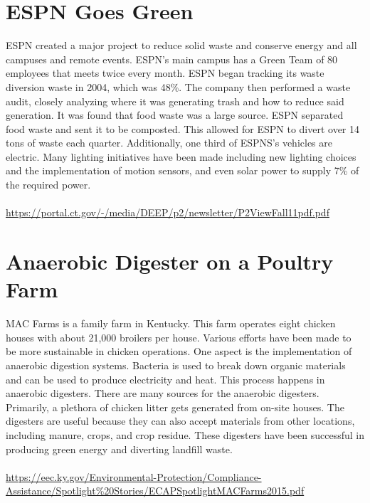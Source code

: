 \documentclass{article}
\begin{document}
\begin{spacing}{2.15}
    \section{ESPN Goes Green}
    \indent ESPN created a major project to reduce solid waste and conserve energy and all campuses and remote events. ESPN's main campus has a Green Team of 80 employees that meets twice every month. ESPN began tracking its waste diversion waste in 2004, which was 48\%. The company then performed a waste audit, closely analyzing where it was generating trash and how to reduce said generation. It was found that food waste was a large source. ESPN separated food waste and sent it to be composted. This allowed for ESPN to divert over 14 tons of waste each quarter. Additionally, one third of ESPNS's vehicles are electric. Many lighting initiatives have been made including new lighting choices and the implementation of motion sensors, and even solar power to supply 7\% of the required power. \\\\
    \url{https://portal.ct.gov/-/media/DEEP/p2/newsletter/P2ViewFall11pdf.pdf}
    \newpage
    \section{Anaerobic Digester on a Poultry Farm}
    \indent MAC Farms is a family farm in Kentucky. This farm operates eight chicken houses with about 21,000 broilers per house. Various efforts have been made to be more sustainable in chicken operations. One aspect is the implementation of anaerobic digestion systems. Bacteria is used to break down organic materials and can be used to produce electricity and heat. This process happens in anaerobic digesters. There are many sources for the anaerobic digesters. Primarily, a plethora of chicken litter gets generated from on-site houses. The digesters are useful because they can also accept materials from other locations, including manure, crops, and crop residue. These digesters have been successful in producing green energy and diverting landfill waste. \\\\
    \url{https://eec.ky.gov/Environmental-Protection/Compliance-Assistance/Spotlight%20Stories/ECAPSpotlightMACFarms2015.pdf}

\end{spacing}
\end{document}

